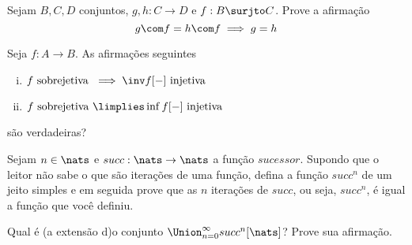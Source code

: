 \begin{exercise}
    Sejam $B, C, D$ conjuntos, $g, h : C \to D$ e $f : B \surjto C$. Prove a
    afirmação
    $$
    g \com f = h \com f \implies g = h
    $$
\end{exercise}

\begin{exercise}
    Seja $f : A \to B$. As afirmações seguintes
    \begin{enumerate}[(i)]
        \item $f \text{ sobrejetiva } \implies \inv f[-] \text{ injetiva }$
        \item $f \text{ sobrejetiva } \limplies \inf f[-] \text{ injetiva }$
    \end{enumerate}
    são verdadeiras?
\end{exercise}

\begin{exercise}
    Sejam $n \in \nats$ e $succ : \nats \to \nats$ a função $sucessor$. Supondo
    que o leitor não sabe o que são iterações de uma função, defina a função
    $succ^n$ de um jeito simples e em seguida prove que as $n$ iterações de
    $succ$, ou seja, $succ^n$, é igual a função que você definiu.
\end{exercise}

\begin{homework}
    Qual é (a extensão d)o conjunto $\Union_{n = 0}^\infty succ^n[\nats]$? Prove
    sua afirmação.
\end{homework}
